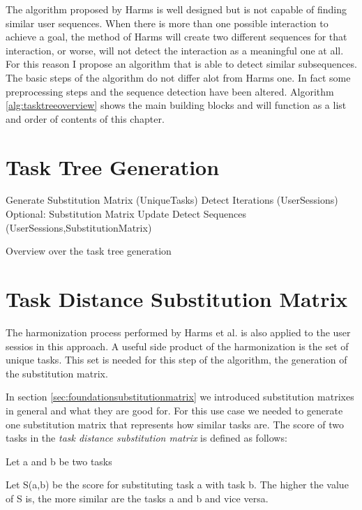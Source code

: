 The algorithm proposed by Harms is well designed but is not capable of finding similar user sequences. 
When there is more than one possible interaction to achieve a goal, the method of Harms will create two different sequences for that interaction, 
or worse, will not detect the interaction as a meaningful one at all. For this reason I propose an algorithm that is able to detect similar subsequences.
The basic steps of the algorithm do not differ alot from Harms one. In fact some preprocessing steps and the sequence detection have been altered.
Algorithm \ref{alg:tasktreeoverview} shows the main building blocks and will function as a list and order of contents of this chapter.
\section{Task Tree Generation}

\begin{algorithm}[h]
\begin{algorithmic}
	\State Generate Substitution Matrix (UniqueTasks)
	\State Detect Iterations (UserSessions)
	\State Optional: Substitution Matrix Update
	\State Detect Sequences (UserSessions,SubstitutionMatrix)
	\EndWhile
	\EndProcedure
\end{algorithmic}
\caption{Overview over the task tree generation}
\label{alg:tasktreeoverview}
\end{algorithm}

\section{Task Distance Substitution Matrix}
The harmonization process performed by Harms et al. is also applied to the user sessios in this approach. 
A useful side product of the harmonization is the set of unique tasks.
This set is needed for this step of the algorithm, the generation of the substitution matrix.

In section \ref{sec:foundationsubstitutionmatrix} we introduced substitution matrixes in general and what they are good for. 
For this use case we needed to generate one substitution matrix that represents how similar tasks are. 
The score of two tasks in the \textit{task distance substitution matrix} is defined as follows:
\begin{definition}
	\item Let a and b be two tasks
	\item Let S(a,b) be the score for substituting task a with task b. The higher the value of S is, the more similar are the tasks a and b and vice versa.
\end{definition}

